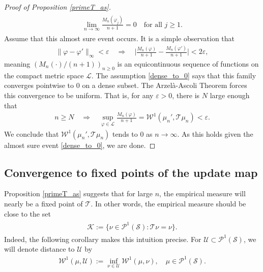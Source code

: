 \documentclass[11pt,reqno]{amsart}
\numberwithin{equation}{section}
\theoremstyle{definition}
\begin{document}
\begin{proof}[Proof of Proposition \ref{primeT_as}]
{\begin{align} \begin{split} {
\lim_{n \to \infty} \frac{M_n({\varphi}_j)}{n+1} = 0 \quad \text{for all $j \geq 1$.} \label{dense_to_0}
} \end{split} \end{align}}
Assume that this almost sure event occurs.
It is a simple observation that
{\begin{align*} {
\|{\varphi} - {\varphi}'\|_\infty < {\varepsilon} \quad \Rightarrow \quad \bigg|\frac{M_n({\varphi})}{n+1} - \frac{M_n({\varphi}')}{n+1}\bigg| < 2{\varepsilon},
} \end{align*}}
meaning $(M_n(\cdot)/(n+1))_{n \geq 0}$ is an equicontinuous sequence of functions on the compact metric space ${\mathcal{L}}$.
The assumption \eqref{dense_to_0} says that this family converges pointwise to $0$ on a dense subset.
The Arzel\`a-Ascoli Theorem forces this convergence to be uniform.
That is, for any ${\varepsilon} > 0$, there is $N$ large enough that
{\begin{align*} {
n \geq N \quad \Rightarrow \quad \sup_{{\varphi} \in {\mathcal{L}}} \frac{M_n({\varphi})}{n+1} = {\mathcal{W}}^1(\mu_n',{\mathcal{T}}\mu_n) < {\varepsilon}.
} \end{align*}}
We conclude that ${\mathcal{W}}^1(\mu_n',{\mathcal{T}}\mu_n)$ tends to 0 as $n \to \infty$.
As this holds given the almost sure event \eqref{dense_to_0}, we are done.
\end{proof}

\subsection{Convergence to fixed points of the update map} \label{convergence_fixed}
Proposition \ref{primeT_as} suggests that for large $n$, the empirical measure will nearly be a fixed point of ${\mathcal{T}}$.
In other words, the empirical measure should be close to the set
{\begin{align} \begin{split} {
{\mathcal{K}} := \{\nu \in {\mathcal{P}}^1({\mathcal{S}}) : {\mathcal{T}}\nu = \nu\}. \label{K_def}
} \end{split} \end{align}}
Indeed, the following corollary makes this intuition precise.
For ${\mathcal{U}} \subset {\mathcal{P}}^1({\mathcal{S}})$, we will denote distance to ${\mathcal{U}}$ by
{\begin{align*} {
{\mathcal{W}}^1(\mu,{\mathcal{U}}) := \inf_{\nu \in {\mathcal{U}}} {\mathcal{W}}^1(\mu,\nu), \quad \mu \in {\mathcal{P}}^1({\mathcal{S}}).
} \end{align*}}
\end{document}
